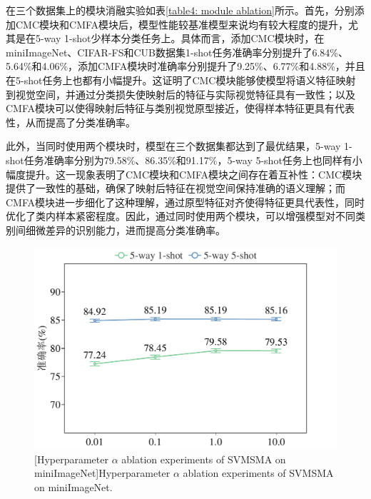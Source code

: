 在三个数据集上的模块消融实验如表\ref{table4: module ablation}所示。首先，分别添加CMC模块和CMFA模块后，模型性能较基准模型来说均有较大程度的提升，尤其是在5-way 1-shot少样本分类任务上。具体而言，添加CMC模块时，在miniImageNet、CIFAR-FS和CUB数据集1-shot任务准确率分别提升了6.84\%、5.64\%和4.06\%，添加CMFA模块时准确率分别提升了9.25\%、6.77\%和4.88\%，并且在5-shot任务上也都有小幅提升。这证明了CMC模块能够使模型将语义特征映射到视觉空间，并通过分类损失使映射后的特征与实际视觉特征具有一致性；以及CMFA模块可以使得映射后特征与类别视觉原型接近，使得样本特征更具有代表性，从而提高了分类准确率。

此外，当同时使用两个模块时，模型在三个数据集都达到了最优结果，5-way 1-shot任务准确率分别为79.58\%、86.35\%和91.17\%，5-way 5-shot任务上也同样有小幅度提升。这一现象表明了CMC模块和CMFA模块之间存在着互补性：CMC模块提供了一致性的基础，确保了映射后特征在视觉空间保持准确的语义理解；而CMFA模块进一步细化了这种理解，通过原型特征对齐使得特征更具代表性，同时优化了类内样本紧密程度。因此，通过同时使用两个模块，可以增强模型对不同类别间细微差异的识别能力，进而提高分类准确率。

\begin{figure}[h!]
  \centering
  \includegraphics[width=0.6\columnwidth]{figures/SVMSMA/miniImageNet/alpha.pdf}
  [Hyperparameter $\alpha$ ablation experiments of SVMSMA on miniImageNet]{Hyperparameter $\alpha$ ablation experiments of SVMSMA on miniImageNet.}
  \label{figure4: alpha (miniImageNet)}
\end{figure}

